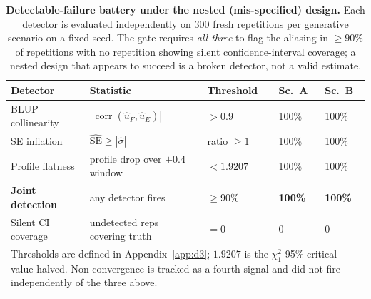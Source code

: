 \documentclass{ieeeaccess}
\theoremstyle{definition}
\theoremstyle{plain}
\begin{document}
\begin{table}[t]
\caption{\textbf{Detectable-failure battery under the nested (mis-specified)
design.} Each detector is evaluated independently on 300 fresh repetitions per
generative scenario on a fixed seed. The gate requires \emph{all three} to flag
the aliasing in $\ge90\%$ of repetitions with no repetition showing silent
confidence-interval coverage; a nested design that appears to succeed is a
broken detector, not a valid estimate.}
\label{tab:d3}
\setlength{\tabcolsep}{3pt}
\footnotesize
\begin{tabular}{|p{60pt}|p{58pt}|p{34pt}|p{28pt}|p{28pt}|}
\hline
Detector & Statistic & Threshold & Sc.\ A & Sc.\ B \\
\hline
BLUP collinearity & $|\operatorname{corr}(\hat{u}_{F},\hat{u}_{E})|$ & $>0.9$ & 100\% & 100\% \\
SE inflation & $\widehat{\mathrm{SE}} \ge |\hat{\sigma}|$ & ratio $\ge1$ & 100\% & 100\% \\
Profile flatness & profile drop over $\pm0.4$ window & $<1.9207$ & 100\% & 100\% \\
\hline
\textbf{Joint detection} & any detector fires & $\ge90\%$ & \textbf{100\%} & \textbf{100\%} \\
Silent CI coverage & undetected reps covering truth & $=0$ & 0 & 0 \\
\hline
\multicolumn{5}{p{225pt}}{Thresholds are defined in Appendix~\ref{app:d3};
$1.9207$ is the $\chi^{2}_{1}$ 95\% critical value halved. Non-convergence is
tracked as a fourth signal and did not fire independently of the three above.}\\
\end{tabular}
\end{table}
\end{document}
